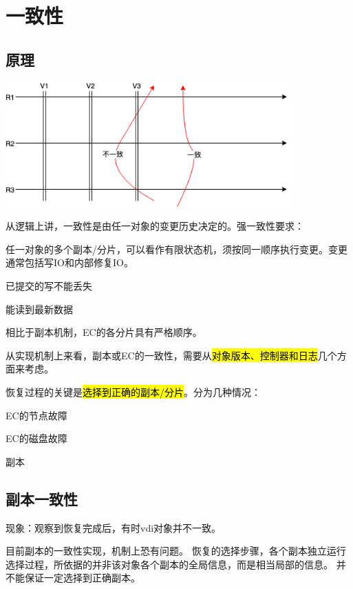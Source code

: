 \chapter{一致性}

\section{原理}

\includegraphics[width=11cm]{../imgs/consistency-splice.png}

从逻辑上讲，一致性是由任一对象的变更历史决定的。强一致性要求：
\begin{enumbox}
\item 任一对象的多个副本/分片，可以看作有限状态机，须按同一顺序执行变更。变更通常包括写IO和内部修复IO。
\item 已提交的写不能丢失
\item 能读到最新数据
\end{enumbox}

相比于副本机制，EC的各分片具有严格顺序。

从实现机制上来看，副本或EC的一致性，需要从\hl{对象版本、控制器和日志}几个方面来考虑。

恢复过程的关键是\hl{选择到正确的副本/分片}。分为几种情况：
\begin{enumbox}
\item EC的节点故障
\item EC的磁盘故障
\item 副本
\end{enumbox}

\section{副本一致性}

现象：观察到恢复完成后，有时vdi对象并不一致。

目前副本的一致性实现，机制上恐有问题。
恢复的选择步骤，各个副本独立运行选择过程，所依据的并非该对象各个副本的全局信息，而是相当局部的信息。
并不能保证一定选择到正确副本。

